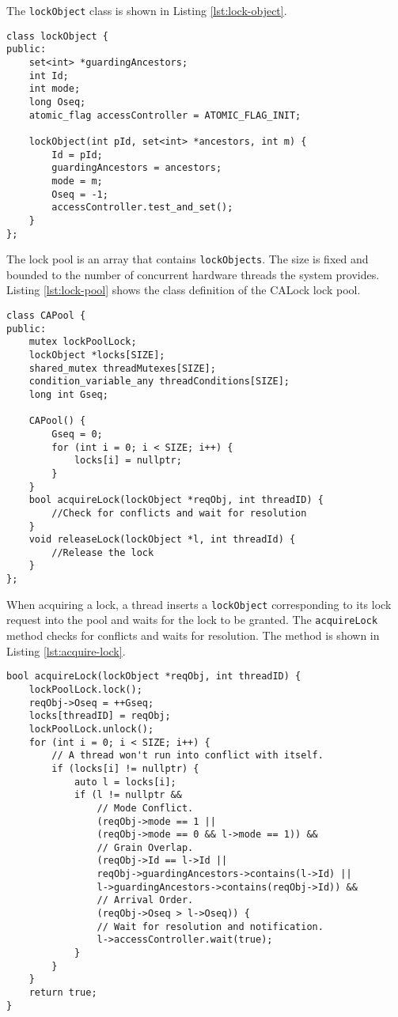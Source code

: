 The \texttt{lockObject} class is shown in Listing \ref{lst:lock-object}. 

\begin{lstlisting}[caption={Lock Object class}, label={lst:lock-object}]
class lockObject {
public:
    set<int> *guardingAncestors;
    int Id;
    int mode;
    long Oseq;
    atomic_flag accessController = ATOMIC_FLAG_INIT;

    lockObject(int pId, set<int> *ancestors, int m) {
        Id = pId;
        guardingAncestors = ancestors;
        mode = m;
        Oseq = -1;
        accessController.test_and_set();
    }
};
\end{lstlisting}

The lock pool is an array that contains \texttt{lockObjects}. The size is fixed and bounded to the number of concurrent hardware threads the system provides. Listing \ref{lst:lock-pool} shows the class definition of the CALock lock pool.

\begin{lstlisting}[caption={Lock Pool class}, label={lst:lock-pool}]
class CAPool {
public:
    mutex lockPoolLock;
    lockObject *locks[SIZE];
    shared_mutex threadMutexes[SIZE];
    condition_variable_any threadConditions[SIZE];
    long int Gseq;

    CAPool() {
        Gseq = 0;
        for (int i = 0; i < SIZE; i++) {
            locks[i] = nullptr;
        }
    }
    bool acquireLock(lockObject *reqObj, int threadID) {
        //Check for conflicts and wait for resolution
    }
    void releaseLock(lockObject *l, int threadId) {
        //Release the lock
    }
};
\end{lstlisting}


When acquiring a lock, a thread inserts a \texttt{lockObject} corresponding to its lock request into the pool and waits for the lock to be granted. The \texttt{acquireLock} method checks for conflicts and waits for resolution. The method is shown in Listing \ref{lst:acquire-lock}.

\begin{lstlisting}[caption={Acquiring a lock}, label={lst:acquire-lock}]
bool acquireLock(lockObject *reqObj, int threadID) {
    lockPoolLock.lock();
    reqObj->Oseq = ++Gseq;
    locks[threadID] = reqObj;
    lockPoolLock.unlock();
    for (int i = 0; i < SIZE; i++) {
        // A thread won't run into conflict with itself.
        if (locks[i] != nullptr) {
            auto l = locks[i];
            if (l != nullptr &&
                // Mode Conflict.
                (reqObj->mode == 1 || 
                (reqObj->mode == 0 && l->mode == 1)) &&
                // Grain Overlap.
                (reqObj->Id == l->Id ||
                reqObj->guardingAncestors->contains(l->Id) ||
                l->guardingAncestors->contains(reqObj->Id)) &&
                // Arrival Order.
                (reqObj->Oseq > l->Oseq)) {
                // Wait for resolution and notification.
                l->accessController.wait(true);
            }
        }
    }
    return true;
}
\end{lstlisting}

